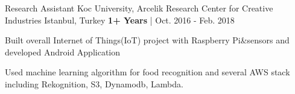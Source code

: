 \begin{cventries}
\vspace{-2mm}
  \cventry
    {Research Assistant} %
    {Koc University, Arcelik Research Center for Creative Industries} %
    {Istanbul, Turkey} %
    {\textbf{1+ Years} | Oct. 2016 - Feb. 2018} %
    {
      \begin{cvitems} %
       	\item {Built overall Internet of Things(IoT) project with Raspberry Pi\&sensors and developed Android Application}
       	\item {Used machine learning algorithm for food recognition and several AWS stack including Rekognition, S3, Dynamodb, Lambda.} 
      \end{cvitems}
    }
\begin{comment}
  \cventry
    {Work \& Study} %
    {Koc University, Computer Information Technology Department} %
    {Istanbul, Turkey} %
    {OCt. 2015 - May. 2016} %
    {
      \begin{cvitems} %
        \item {Applied and tested Google Cloud technologies across the campus.}
      \end{cvitems}
    }
  \cventry
  {Web Application}
  {Personal Project - ku-bookshare.github.io} %
    {} %
    {3+ Months | Mar. 2019 - Present} %
    {
      \begin{cvitems} %
      	\item {Developing React web application which users can donate or borrow books from the shelves among KU campus. } 
      \end{cvitems}
    }

\end{comment}
\end{cventries}
